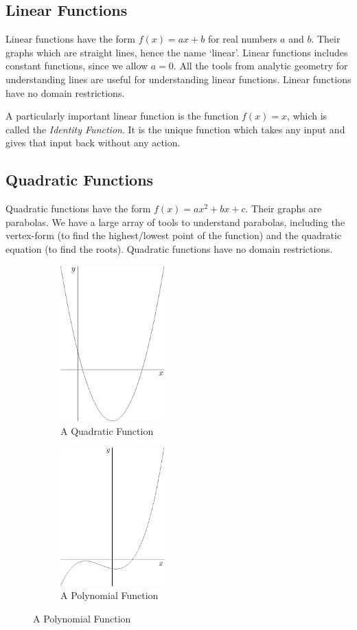 \documentclass[fleqn]{report}
\begin{document}
\subsection*{Linear Functions}

Linear functions have the form $f(x) = ax + b$ for real
numbers $a$ and $b$. Their graphs which are straight lines,
hence the name `linear'. Linear functions includes constant
functions, since we allow $a=0$. All the tools from analytic
geometry for understanding lines are useful for understanding
linear functions. Linear functions have no domain
restrictions. 

A particularly important linear function is the function $f(x)
= x$, which is called the \emph{Identity Function}. It is the
unique function which takes any input and gives that input back
without any action.

\subsection*{Quadratic Functions}

Quadratic functions have the form $f(x) = ax^2 + bx + c$.
Their graphs are parabolas. We have a large array of
tools to understand parabolas, including the vertex-form (to find
the highest/lowest point of the function) and the quadratic
equation (to find the roots). Quadratic functions have no
domain restrictions.

\vspace{1cm}

\begin{figure}[ht]
\centering
\begin{subfigure}{.5\textwidth}
 \centering
 \includegraphics[width=4cm]{figure33.eps}
 \caption{A Quadratic Function}
\end{subfigure}%
\begin{subfigure}{.5\textwidth}
 \centering
 \includegraphics[width=4cm]{figure28.eps}
 \caption{A Polynomial Function}
\end{subfigure}
\label{Types of Functions 2}
\end{figure}
\end{document}
